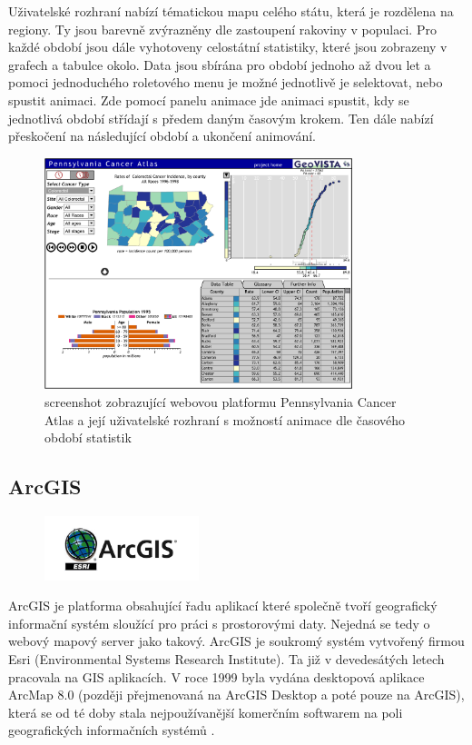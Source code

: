 Uživatelské rozhraní nabízí tématickou mapu celého státu, která je rozdělena na regiony. Ty jsou barevně zvýrazněny dle zastoupení rakoviny v populaci. Pro každé období jsou dále vyhotoveny celostátní statistiky, které jsou zobrazeny v grafech a tabulce okolo. Data jsou sbírána pro období jednoho až dvou let a pomoci jednoduchého roletového menu je možné jednotlivě je selektovat, nebo spustit animaci. Zde pomocí panelu animace jde animaci spustit, kdy se jednotlivá období střídají s předem daným časovým krokem. Ten dále nabízí přeskočení na následující období a ukončení animování.

\begin{figure}[h!]
	\centering
	\includegraphics[width=0.8\textwidth]{../img/pennsylvania-cancer-atlas.png}
	\caption{screenshot zobrazující webovou platformu Pennsylvania Cancer Atlas a její uživatelské rozhraní s možností animace dle časového období statistik}
	\label{fig:gay-sands}
\end{figure}
 
\newpage
\subsection{ArcGIS}

\begin{figure}[h!]
	\centering
	\includegraphics[width=0.4\textwidth]{../img/arcgis-logo.jpg}
	\label{fig:arcgis-logo}
\end{figure}
\bigskip

ArcGIS je platforma obsahující řadu aplikací které společně tvoří geografický informační systém sloužící pro práci s prostorovými daty. Nejedná se tedy o webový mapový server jako takový. ArcGIS je soukromý systém vytvořený firmou Esri (Environmental Systems Research Institute). Ta již v devedesátých letech pracovala na GIS aplikacích. V roce 1999 byla vydána desktopová aplikace ArcMap 8.0 (později přejmenovaná na ArcGIS Desktop a poté pouze na ArcGIS), která se od té doby stala nejpoužívanější komerčním softwarem na poli geografických informačních systémů \cite{arcgis_history}. 

